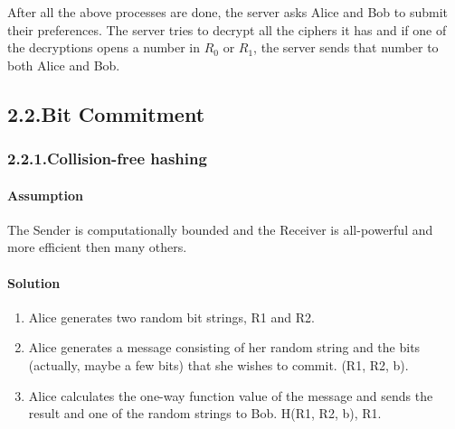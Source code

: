 \documentclass{article}
\begin{document}
\noindent{}After all the above processes are done, the server asks Alice and Bob to submit their preferences. The server tries to decrypt all the ciphers it has and if one of the decryptions opens a number in $R_{0}$ or $R_{1}$, the server sends that number to both Alice and Bob.%

\subsection{2.2.\hspace*{0.5em}Bit Commitment}\label{sec-bit-commitment}%

\subsubsection{2.2.1.\hspace*{0.5em}Collision-free hashing}\label{sec-collision-free-hashing}%

\paragraph{Assumption}\label{sec-assumption}%

\noindent{}The Sender is computationally bounded and the Receiver is all-powerful and more efficient then many others.%

\paragraph{Solution}\label{sec-solution}%

\begin{enumerate}[noitemsep,topsep=\mdcompacttopsep]%

\item{}Alice generates two random bit strings, R1 and R2.  %

\item{}Alice generates a message consisting of her random string and the bits (actually, maybe a few bits) that she wishes to commit. (R1, R2, b).%

\item{}Alice calculates the one-way function value of the message and sends the result and one of the random strings to Bob. H(R1, R2, b), R1.%
\end{enumerate}%
\end{document}
